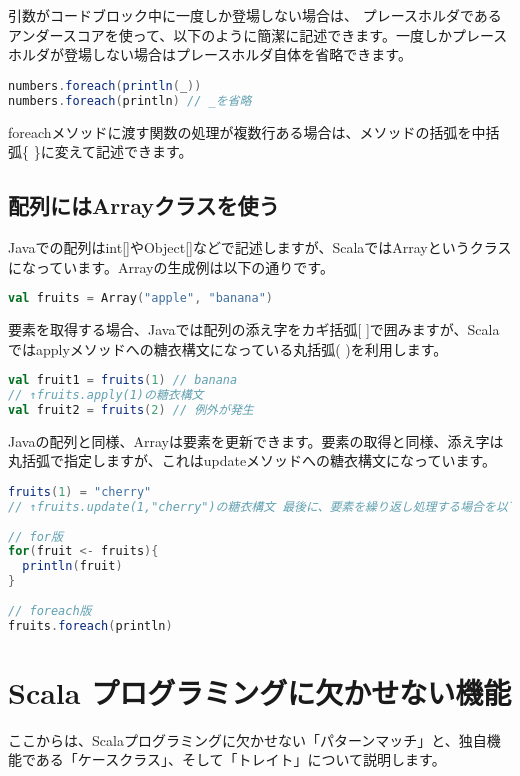 引数がコードブロック中に一度しか登場しない場合は、 プレースホルダであるアンダースコアを使って、以下のように簡潔に記述できます。一度しかプレースホルダが登場しない場合はプレースホルダ自体を省略できます。

\begin{lstlisting}[language=scala, frame=none]
numbers.foreach(println(_))
numbers.foreach(println) // _を省略
\end{lstlisting}

foreachメソッドに渡す関数の処理が複数行ある場合は、メソッドの括弧を中括弧\{ \}に変えて記述できます。
\subsection{配列にはArrayクラスを使う}
Javaでの配列はint[]やObject[]などで記述しますが、ScalaではArrayというクラスになっています。Arrayの生成例は以下の通りです。

\begin{lstlisting}[language=scala, frame=none]
val fruits = Array("apple", "banana")
\end{lstlisting}

要素を取得する場合、Javaでは配列の添え字をカギ括弧[ ]で囲みますが、Scalaではapplyメソッドへの糖衣構文になっている丸括弧( )を利用します。

\begin{lstlisting}[language=scala, frame=none]
val fruit1 = fruits(1) // banana
// ↑fruits.apply(1)の糖衣構文
val fruit2 = fruits(2) // 例外が発生
\end{lstlisting}

Javaの配列と同様、Arrayは要素を更新できます。要素の取得と同様、添え字は丸括弧で指定しますが、これはupdateメソッドへの糖衣構文になっています。

\begin{lstlisting}[language=scala, frame=none]
fruits(1) = "cherry"
// ↑fruits.update(1,"cherry")の糖衣構文 最後に、要素を繰り返し処理する場合を以下に示します。
 
// for版 
for(fruit <- fruits){
  println(fruit)
}
 
// foreach版
fruits.foreach(println)
\end{lstlisting}

\section{Scala プログラミングに欠かせない機能}
ここからは、Scalaプログラミングに欠かせない「パターンマッチ」と、独自機能である「ケースクラス」、そして「トレイト」について説明します。 

